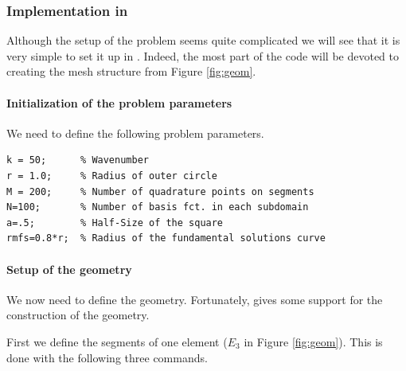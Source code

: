 \subsubsection{Implementation in \mpspack}

Although the setup of the problem seems quite complicated we will see
that it is very simple to set it up in \mpspack. Indeed, the most part
of the code will be devoted to creating the mesh structure from
Figure \ref{fig:geom}.

\paragraph{Initialization of the problem parameters}

We need to define the following problem parameters.
\begin{verbatim}
k = 50;      % Wavenumber
r = 1.0;     % Radius of outer circle    
M = 200;     % Number of quadrature points on segments
N=100;       % Number of basis fct. in each subdomain
a=.5;        % Half-Size of the square
rmfs=0.8*r;  % Radius of the fundamental solutions curve
\end{verbatim}


\paragraph{Setup of the geometry}

We now need to define the geometry. Fortunately,
\mpspack gives some support for the construction of the geometry.

First we define the segments of one element ($E_3$ in Figure
\ref{fig:geom}). This is done with the following three commands.


